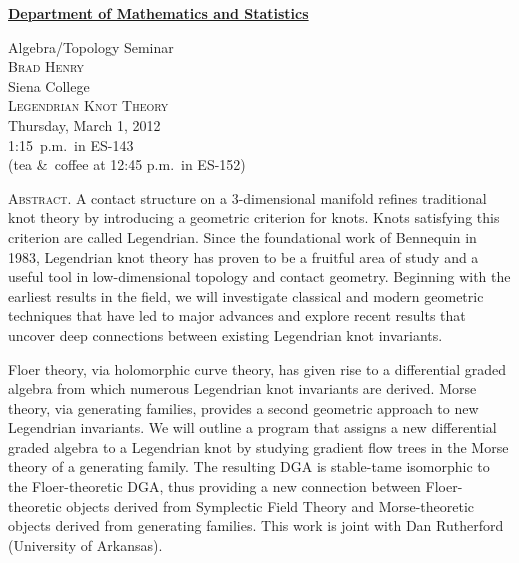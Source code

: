 \documentclass[12pt]{article}
\begin{document}
\noindent\hspace{-28pt}\raisebox{-19pt}{\XeTeXpicfile UAlogo.jpg scaled 340}%
\hfill\textsf{\textbf{\footnotesize\href{http://www.albany.edu/math/}{Department of Mathematics and Statistics}}}\bigskip\bigskip

\begin{center}\Large
  \textsf{\huge Algebra/Topology Seminar}\\[2.5\bigskipamount]
  \textsc{Brad Henry}\\
  {\large Siena College}\\[\bigskipamount]
  \textsc{Legendrian Knot Theory}\\[2\bigskipamount]
  Thursday, March 1, 2012\\ 1:15~p.m.\ in ES-143\\
  (tea \&\ coffee at 12:45 p.m.\ in ES-152)
\end{center}\bigskip\bigskip

\noindent\large\textsc{Abstract.}
A contact structure on a 3-dimensional manifold refines traditional knot theory by introducing a geometric criterion for knots. Knots satisfying this criterion are called Legendrian. Since the foundational work of Bennequin in 1983, Legendrian knot theory has proven to be a fruitful area of study and a useful tool in low-dimensional topology and contact geometry. Beginning with the earliest results in the field, we will investigate classical and modern geometric techniques that have led to major advances and explore recent results that uncover deep connections between existing Legendrian knot invariants.

Floer theory, via holomorphic curve theory, has given rise to a differential graded algebra from which numerous Legendrian knot invariants are derived. Morse theory, via generating families, provides a second geometric approach to new Legendrian invariants. We will outline a program that assigns a new differential graded algebra to a Legendrian knot by studying gradient flow trees in the Morse theory of a generating family. The resulting DGA is stable-tame isomorphic to the Floer-theoretic DGA, thus providing a new connection between Floer-theoretic objects derived from Symplectic Field Theory and Morse-theoretic objects derived from generating families. This work is joint with Dan Rutherford (University of Arkansas).
\end{document}
